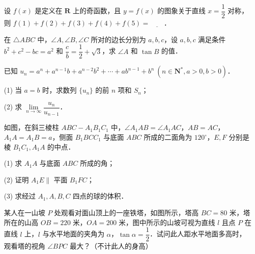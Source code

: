 \begin{question}
设 $f(x)$ 是定义在 $\mathbf{R}$ 上的奇函数，且 $y = f(x)$ 的图象关于直线 $x = \dfrac{1}{2}$ 对称，则 $f(1) + f(2) + f(3) + f(4) + f(5) = \underline{\hspace{2em}}$．

\end{question}

\begin{question}
在 $\triangle ABC$ 中，$\angle A, \angle B, \angle C$ 所对的边长分别为 $a, b, c$，设 $a, b, c$ 满足条件 $b^2 + c^2 - bc = a^2$ 和 $\dfrac{c}{b} = \dfrac{1}{2} + \sqrt{3}$，求 $\angle A$ 和 $\tan B$ 的值．

\end{question}
\begin{question}
已知 $u_n = a^n + a^{n-1}b + a^{n-2}b^2 + \cdots + ab^{n-1} + b^n\ (n \in \mathbf{N}^*, a > 0, b > 0)$．

(1) 当 $a = b$ 时，求数列 $\{u_n\}$ 的前 $n$ 项和 $S_n$；

(2) 求 $\lim\limits_{n \to \infty} \dfrac{u_n}{u_{n-1}}$．

\Needspace{0.4\textheight}
\end{question}
\begin{question}
如图，在斜三棱柱 $ABC - A_1B_1C_1$ 中，$\angle A_1AB = \angle A_1AC$，$AB = AC$，$A_1A = A_1B = a$，侧面 $B_1BCC_1$ 与底面 $ABC$ 所成的二面角为 $120^\circ$，$E, F$ 分别是棱 $B_1C_1, A_1A$ 的中点．

(1) 求 $A_1A$ 与底面 $ABC$ 所成的角；

(2) 证明 $A_1E \parallel$ 平面 $B_1FC$；

(3) 求经过 $A_1, A, B, C$ 四点的球的体积．
\nopagebreak[4]
\begin{center}\end{center}
\nopagebreak[4]
\Needspace{0.4\textheight}
\end{question}
\begin{question}
某人在一山坡 $P$ 处观看对面山顶上的一座铁塔，如图所示，塔高 $BC = 80$ 米，塔所在的山高 $OB = 220$ 米，$OA = 200$ 米，图中所示的山坡可视为直线 $l$ 且点 $P$ 在直线 $l$ 上，$l$ 与水平地面的夹角为 $\alpha$，$\tan \alpha = \dfrac{1}{2}$．试问此人距水平地面多高时，观看塔的视角 $\angle BPC$ 最大？（不计此人的身高）
\nopagebreak[4]
\begin{center}\end{center}
\nopagebreak[4]
\end{question}
